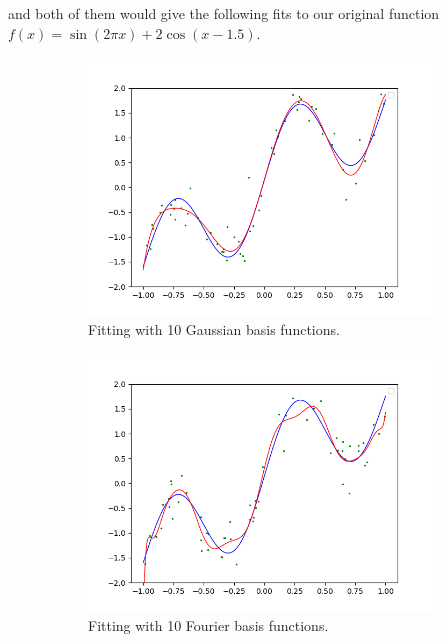\documentclass{article}
\theoremstyle{definition}
\theoremstyle{remark}
\theoremstyle{definition}
\begin{document}
and both of them would give the following fits to our original function $f(x) = \sin(2\pi x) + 2 \cos(x - 1.5)$. 
\begin{figure}[hbt!]
    \centering
    \begin{subfigure}[b]{0.48\textwidth}
    \centering
        \includegraphics[width=\textwidth]{Section_2/Gaussian_Fit.png}
        \caption{Fitting with 10 Gaussian basis functions. }
        \label{fig:d}
    \end{subfigure}
    \hfill 
    \begin{subfigure}[b]{0.48\textwidth}
    \centering
        \includegraphics[width=\textwidth]{Section_2/Fourier_Fit.png}
        \caption{Fitting with 10 Fourier basis functions. }
        \label{fig:d}
    \end{subfigure}
    \caption{}
    \label{Coincide_mean}
\end{figure}
\end{document}
